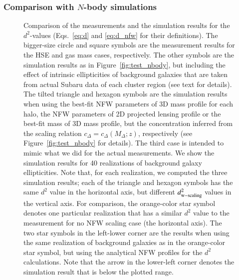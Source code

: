 \documentclass[iop, apj]{emulateapj}
\newcommand{\?}{\stackrel{?}{=}}
\begin{document}
\subsubsection{Comparison with $N$-body simulations}
 \begin{figure}
%
%
  \caption{Comparison of the measurements and the simulation results for
  the $d^2$-values (Eqs.~\ref{eq:d} and \ref{eq:d_nfw} for their
  definitions).  The bigger-size circle and square symbols are the
  measurement results for the HSE and gas mass cases, respectively. The
  other symbols are the simulation results as in
  Figure~\ref{fig:test_nbody}, but including the effect of intrinsic
  ellipticities of background galaxies that are taken from actual Subaru
  data of each cluster region (see text for details).
  The tilted triangle and hexagon symbols are the simulation results
  when using the best-fit NFW parameters of 3D mass profile for each
  halo, the NFW parameters of 2D projected lensing profile or the
  best-fit mass of 3D mass profile, but the concentration inferred from the
  scaling relation $c_\Delta=c_\Delta(M_\Delta;z)$, respectively (see
  Figure~\ref{fig:test_nbody} for details). The third case is intended
  to mimic what we did for the actual measurements. We show the
  simulation results for 40 realizations of background galaxy
  ellipticities. Note that, for each realization, we computed the three
  simulation results; each of the triangle and hexagon symbols has the
  same $d^2$ value in the horizontal axis, but different $d^2_{\rm
  w-scaling}$ values in the vertical axis.  For comparison, the
  orange-color star symbol denotes one particular realization that has a
  similar $d^2$ value to the measurement for no NFW scaling case (the
  horizontal axis). The two star symbols in the left-lower corner are the
  results when using the same realization of background galaxies as in
  the orange-color star symbol, but using the analytical NFW profiles
  for the $d^2$ calculations. Note that the arrow in the lower-left
  corner denotes the simulation result that is below the plotted range.
  \label{fig:d2-vs-nbody}}
 \end{figure}
\end{document}
